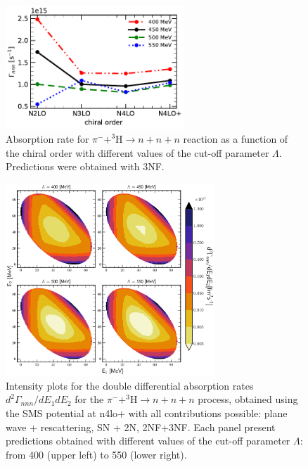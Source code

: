     \begin{figure}[h]
        \begin{center}
        \includegraphics[width=0.6\textwidth]{PlotData/PION/Dalitz_maps/figures/Gamma_nnn.pdf}
        \end{center}
        \caption{Absorption rate for $\pi^- + ^3\text{H} \rightarrow n + n + n$ reaction as a function
        of the chiral order with different values of the cut-off parameter $\Lambda$.
        Predictions were obtained with 3NF.}
        \label{Gamma_nnn}
    \end{figure}


    \begin{figure}[h]
        \begin{center}
        \includegraphics[width=0.7\textwidth]{PlotData/PION/Dalitz_maps/figures/Dalitz_map_nnn_E1E2_cutofs.pdf}
        \end{center}
        \caption{Intensity plots for the double differential absorption rates
        $d^2 \Gamma_{nnn}/dE_1dE_2$ for the $\pi^- + ^3\text{H} \rightarrow n + n + n$
        process, obtained using the SMS potential at \gls{n4lo+}
        with all contributions possible: plane wave + rescattering, SN + 2N, 2NF+3NF.
        Each panel present predictions obtained with different values of the cut-off parameter $\Lambda$:
        from \SI{400}{\mev} (upper left) to \SI{550}{\mev} (lower right).}
        \label{pion_nnn_E1E2_cutoff}
    \end{figure}

